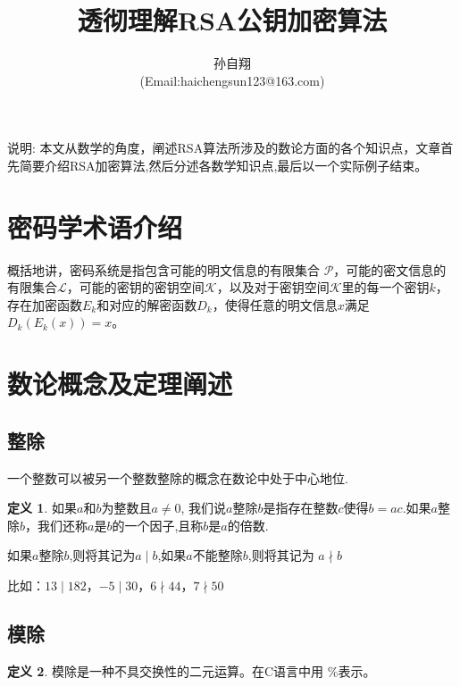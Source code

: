 \documentclass{article}
\title{\huge{透彻理解RSA公钥加密算法} }
\author{孙自翔\\[2pt]
(Email:haichengsun123@163.com) \\[2pt]}
\date{}  %
\theoremstyle{definition}
\newtheorem{dfn}{定义}[section]
\theoremstyle{remark}
\theoremstyle{plain}
\begin{document}
\maketitle

%


说明: 本文从数学的角度，阐述RSA算法所涉及的数论方面的各个知识点，文章首先简要介绍RSA加密算法,然后分述各数学知识点,最后以一个实际例子结束。
% 
\section{密码学术语介绍}
% 
\hspace*{6mm}
概括地讲\cite{BOOK:1}，密码系统是指包含可能的明文信息的有限集合 $\mathscr{P}$，可能的密文信息的有限集合$\mathscr{L}$，可能的密钥的密钥空间$\mathscr{K}$，以及对于密钥空间$\mathscr{K}$里的每一个密钥$k$，存在加密函数$E_k$和对应的解密函数$D_k$，使得任意的明文信息$x$满足$D_k(E_k(x))=x$。


\section{数论概念及定理阐述}
\subsection{整除}   

一个整数可以被另一个整数整除的概念在数论中处于中心地位.
\begin{dfn}
如果$a$和$b$为整数且$a \neq 0$, 我们说$a$整除$b$是指存在整数$c$使得$b=ac$.如果$a$整除$b$，我们还称$a$是$b$的一个因子,且称$b$是$a$的倍数.
\end{dfn}
如果$a$整除$b$,则将其记为$a \mid b$,如果$a$不能整除$b$,则将其记为 $a \nmid b$

比如：$13 \mid 182$，$-5\mid30$，$6 \nmid 44$，$7 \nmid 50$

\subsection{模除}   
\begin{dfn}
模除\cite{WEBSITE:modulo}是一种不具交换性的二元运算。在C语言中用 $\%$表示。
\end{dfn}
\end{document}

